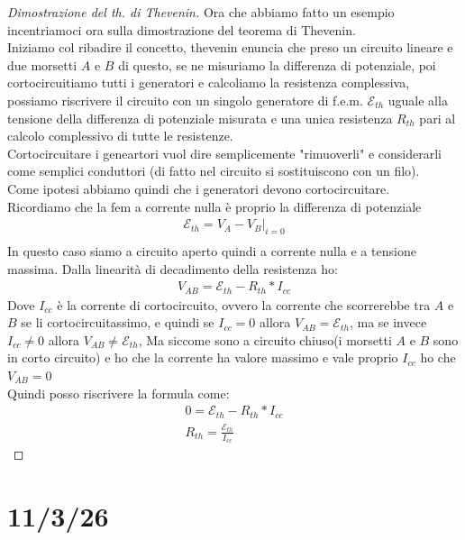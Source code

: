\documentclass[a4paper, oneside]{article}
\newcommand{\E}{\mathcal{E}}
\begin{document}
\begin{proof}[Dimostrazione del th. di Thevenin]
        Ora che abbiamo fatto un esempio incentriamoci ora sulla dimostrazione del teorema di Thevenin.\\
        Iniziamo col ribadire il concetto, thevenin enuncia che preso un circuito lineare e due morsetti $A$ e $B$ di questo, se ne misuriamo la differenza di potenziale, poi cortocircuitiamo tutti i generatori e calcoliamo la resistenza complessiva, possiamo riscrivere il circuito con un singolo generatore di f.e.m. $\E_{th}$ uguale alla tensione della differenza di potenziale misurata e una unica resistenza $R_{th}$ pari al calcolo complessivo di tutte le resistenze.\\
        Cortocircuitare i geneartori vuol dire semplicemente "rimuoverli" e considerarli come semplici conduttori (di fatto nel circuito si sostituiscono con un filo).\\
        Come ipotesi abbiamo quindi che i generatori devono cortocircuitare.\\
        Ricordiamo che la fem a corrente nulla è proprio la differenza di potenziale
        \begin{gather*}
            \E_{th} = V_A - V_B |_{i=0}\\
        \end{gather*}
        In questo caso siamo a circuito aperto quindi a corrente nulla e a tensione massima.
        Dalla linearità di decadimento della resistenza ho:
        \begin{gather*}
            V_{AB} = \E_{th} - R_{th} * I_{cc}
        \end{gather*}
        Dove $I_{cc}$ è la corrente di cortocircuito, ovvero la corrente che scorrerebbe tra $A$ e $B$ se li cortocircuitassimo, e quindi se $I_{cc} = 0$ allora $V_{AB} = \E_{th}$, ma se invece $I_{cc} \neq 0$ allora $V_{AB} \neq \E_{th}$,
        Ma siccome sono a circuito chiuso(i morsetti $A$ e $B$ sono in corto circuito) e ho che la corrente ha valore massimo e vale proprio $I_{cc}$ ho che $V_{AB} = 0$\\
        Quindi posso riscrivere la formula come:
        \begin{gather*}
            0 = \E_{th} - R_{th} * I_{cc}\\
            R_{th} = \frac{\E_{th}}{I_{cc}}
        \end{gather*}
    \end{proof}
\newpage
\section{11/3/26}
\end{document}
